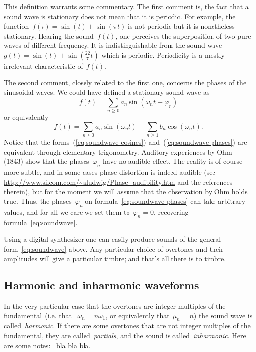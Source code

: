 This definition warrants some commentary.  The first comment is, the fact
that a sound wave is stationary does not mean that it is periodic.  For
example, the function~$f(t)=\sin(t)+\sin(\pi t)$ is not periodic but it is
nonetheless stationary.  Hearing the sound~$f(t)$, one perceives the
superposition of two pure waves of different frequency.  It is
indistinguishable from the sound
wave~$g(t)=\sin(t)+\sin\left(\tfrac{22}7t\right)$ which is periodic.
Periodicity is a mostly irrelevant characteristic of~$f(t)$.

The second comment, closely related to the first one, concerns the phases of
the sinusoidal waves.  We could have defined a stationary sound wave as
\begin{equation}\label{eq:soundwave-phases}
	f(t)=\sum_{n\ge 0}a_n\sin(\omega_nt+\varphi_n)
\end{equation}
or equivalently
\begin{equation}\label{eq:soundwave-cosines}
	f(t)=
	\sum_{n\ge 0}a_n\sin(\omega_nt)
	+\sum_{n\ge 1}b_n\cos(\omega_nt).
\end{equation}
Notice that the forms~(\ref{eq:soundwave-cosines})
and~(\ref{eq:soundwave-phases}) are equivalent through elementary trigonometry.
Auditory experiences by Ohm (1843) show that the phases~$\varphi_n$
have no audible effect.  The reality is of course more subtle, and in some
cases phase distortion is indeed audible (see
\url{http://www.silcom.com/~aludwig/Phase_audibility.htm} and the references
therein), but for the moment we will assume that the observation by Ohm holds
true.  Thus, the phases~$\varphi_n$ on formula~\ref{eq:soundwave-phases} can
take arbitrary values, and for all we care we set them to~$\varphi_n=0$,
recovering formula~\ref{eq:soundwave}.

Using a digital synthesizer one can easily produce sounds of the general
form~\ref{eq:soundwave} above.  Any particular choice of overtones and their
amplitudes will give a particular timbre; and that's all there is to timbre.

\subsection{Harmonic and inharmonic waveforms}

In the very particular case that the overtones are integer multiples of the
fundamental~(i.e. that ~$\omega_n=n\omega_1$, or equivalently that~$\mu_n=n$)
the sound wave is called~\emph{harmonic}.  If there are some overtones that
are not integer multiples of the fundamental, they are
called~\emph{partials}, and the sound is called~\emph{inharmonic}.
Here are some notes:~ bla bla bla.

